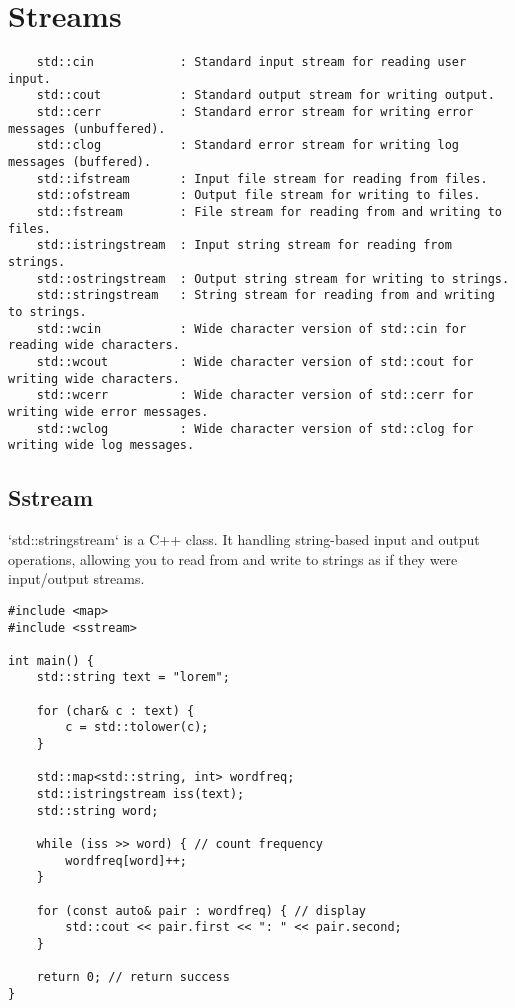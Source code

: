 \section{Streams}

\begin{verbatim}
    std::cin            : Standard input stream for reading user input.
    std::cout           : Standard output stream for writing output.
    std::cerr           : Standard error stream for writing error messages (unbuffered).
    std::clog           : Standard error stream for writing log messages (buffered).
    std::ifstream       : Input file stream for reading from files.
    std::ofstream       : Output file stream for writing to files.
    std::fstream        : File stream for reading from and writing to files.
    std::istringstream  : Input string stream for reading from strings.
    std::ostringstream  : Output string stream for writing to strings.
    std::stringstream   : String stream for reading from and writing to strings.
    std::wcin           : Wide character version of std::cin for reading wide characters.
    std::wcout          : Wide character version of std::cout for writing wide characters.
    std::wcerr          : Wide character version of std::cerr for writing wide error messages.
    std::wclog          : Wide character version of std::clog for writing wide log messages.
\end{verbatim}

\subsection{Sstream}

`std::stringstream` is a C++ class. It handling string-based input and output operations,
allowing you to read from and write to strings as if they were input/output streams.

\begin{verbatim}
#include <map>
#include <sstream>

int main() {
    std::string text = "lorem";

    for (char& c : text) {
        c = std::tolower(c);
    }

    std::map<std::string, int> wordfreq;
    std::istringstream iss(text);
    std::string word;

    while (iss >> word) { // count frequency
        wordfreq[word]++;
    }

    for (const auto& pair : wordfreq) { // display
        std::cout << pair.first << ": " << pair.second;
    }

    return 0; // return success
}
\end{verbatim}


